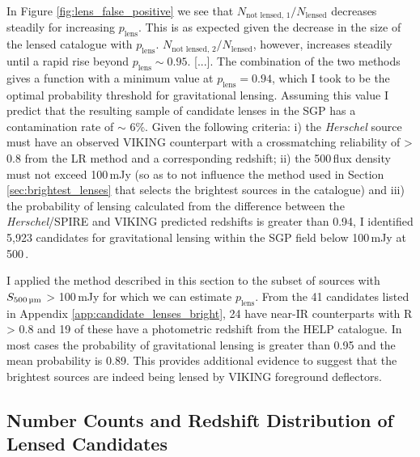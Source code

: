 In Figure \ref{fig:lens_false_positive} we see that $N_{\textrm{not lensed, 1}}/N_{\textrm{lensed}}$ decreases steadily for increasing $p_{\textrm{lens}}$. This is as expected given the decrease in the size of the lensed catalogue with $p_{\textrm{lens}}$. $N_{\textrm{not lensed, 2}}/N_{\textrm{lensed}}$, however, increases steadily until a rapid rise beyond $p_\textrm{lens} \sim 0.95$. [...]. The combination of the two methods gives a function with a minimum value at $p_\textrm{lens} = 0.94$, which I took to be the optimal probability threshold for gravitational lensing. Assuming this value I predict that the resulting sample of candidate lenses in the SGP has a contamination rate of $\sim$ 6\%. Given the following criteria: i) the \textit{Herschel} source must have an observed VIKING counterpart with a crossmatching reliability of > 0.8 from the LR method and a corresponding redshift; ii) the 500\,\micron flux density must not exceed 100\,mJy (so as to not influence the method used in Section \ref{sec:brightest_lenses} that selects the brightest sources in the catalogue) and iii) the probability of lensing calculated from the difference between the \textit{Herschel}/SPIRE and VIKING predicted redshifts is greater than 0.94, I identified 5,923 candidates for gravitational lensing within the SGP field below 100\,mJy at 500\,\micron.

I applied the method described in this section to the subset of sources with $S_{\textrm{500\,\micron}}$ > 100\,mJy for which we can estimate $p_\textrm{lens}$. From the 41 candidates listed in Appendix \ref{app:candidate_lenses_bright}, 24 have near-IR counterparts with R > 0.8 and 19 of these have a photometric redshift from the HELP catalogue. In most cases the probability of gravitational lensing is greater than 0.95 and the mean probability is 0.89. This provides additional evidence to suggest that the brightest sources are indeed being lensed by VIKING foreground deflectors.

\subsection{Number Counts and Redshift Distribution of Lensed Candidates}

